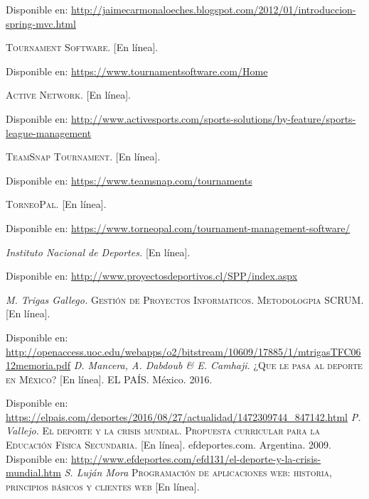 \begin{thebibliography}{}
	\linebreak
	Disponible en: 
	\url{http://jaimecarmonaloeches.blogspot.com/2012/01/introduccion-spring-mvc.html}
	
	\textit{}
	\textsc{Tournament Software.} [En línea].
	
	\linebreak
	Disponible en: 
	\url{https://www.tournamentsoftware.com/Home}
	
	\textit{}
	\textsc{Active Network.} [En línea].
	
	\linebreak
	Disponible en: 
	\url{http://www.activesports.com/sports-solutions/by-feature/sports-league-management}
	
	\textit{}
	\textsc{TeamSnap Tournament.} [En línea].
	
	\linebreak
	Disponible en:
	\url{https://www.teamsnap.com/tournaments}
	
	\textit{}
	\textsc{TorneoPal.} [En línea].
	
	\linebreak
	Disponible en: 
	\url{ https://www.torneopal.com/tournament-management-software/}
	
	\textit{Instituto Nacional de Deportes.}
	\textsc{}[En línea].
	
	\linebreak
	Disponible en:
	\url{http://www.proyectosdeportivos.cl/SPP/index.aspx}
	
	\textit{M. Trigas Gallego.}
	\textsc{Gestión de Proyectos Informaticos. Metodologpia SCRUM.} [En línea].
	
	\linebreak
	Disponible en: 
	\url{http://openaccess.uoc.edu/webapps/o2/bitstream/10609/17885/1/mtrigasTFC0612memoria.pdf}	
	\textit{D. Mancera, A. Dabdoub \& E. Camhaji.}
	\textsc{¿Que le pasa al deporte en México?} [En línea].
	EL PAÍS. México. 2016.
	
	\linebreak
	Disponible en: 
	\url{https://elpais.com/deportes/2016/08/27/actualidad/1472309744_847142.html}	
	\textit{P. Vallejo.}
	\textsc{El deporte y la crisis mundial. Propuesta curricular para la Educación Física Secundaria.} [En línea]. 
	efdeportes.com. Argentina. 2009.
	\linebreak
	Disponible en: 
	\url{http://www.efdeportes.com/efd131/el-deporte-y-la-crisis-mundial.htm}
	\textit{S. Luján Mora}
	\textsc{Programación de aplicaciones web: historia, principios básicos y clientes web} [En línea].
	

\end{thebibliography}
